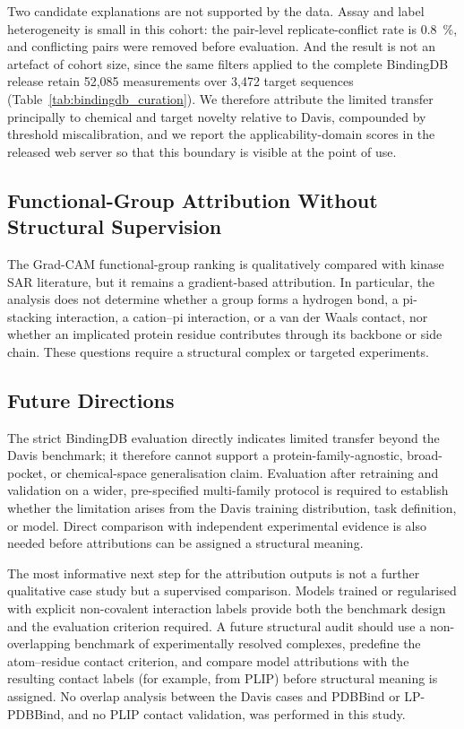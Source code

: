 \documentclass[fleqn,10pt]{wlscirep}
\begin{document}
Two candidate explanations are not supported by the data.  Assay and label
heterogeneity is small in this cohort: the pair-level replicate-conflict rate is
\SI{0.8}{\percent}, and conflicting pairs were removed before evaluation.  And
the result is not an artefact of cohort size, since the same filters applied to
the complete BindingDB release retain 52{,}085 measurements over 3{,}472 target
sequences (Table~\ref{tab:bindingdb_curation}).  We therefore attribute the
limited transfer principally to chemical and target novelty relative to Davis,
compounded by threshold miscalibration, and we report the applicability-domain
scores in the released web server so that this boundary is visible at the point
of use.
\endgroup

\subsection{Functional-Group Attribution Without Structural Supervision}

The Grad-CAM functional-group ranking is qualitatively compared with kinase
SAR literature, but it remains a gradient-based attribution.  In particular,
the analysis does not determine whether a group forms a hydrogen bond, a
pi-stacking interaction, a cation--pi interaction, or a van der Waals contact,
nor whether an implicated protein residue contributes through its backbone or
side chain.  These questions require a structural complex or targeted
experiments.\cite{zhang2009targeting}

\subsection{Future Directions}

The strict BindingDB evaluation directly indicates limited transfer beyond the
Davis benchmark; it therefore cannot support a protein-family-agnostic,
broad-pocket, or chemical-space generalisation claim.  Evaluation after
retraining and validation on a wider, pre-specified multi-family protocol is
required to establish whether the limitation arises from the Davis training
distribution, task definition, or model. Direct comparison with independent
experimental evidence is also needed before attributions can be assigned a
structural meaning.

\begingroup\color{red}
The most informative next step for the attribution outputs is not a further
qualitative case study but a supervised comparison.  Models trained or
regularised with explicit non-covalent interaction labels provide both the
benchmark design and the evaluation criterion
required.\cite{li2020monn,gim2023arkdta,seo2024blendnet}  A future structural
audit should use a non-overlapping benchmark of experimentally resolved
complexes, predefine the atom--residue contact criterion, and compare model
attributions with the resulting contact labels (for example, from
PLIP\cite{salentin2015plip}) before structural meaning is assigned.  No overlap
analysis between the Davis cases and PDBBind or LP-PDBBind, and no PLIP contact
validation, was performed in this study.
\endgroup
\end{document}
